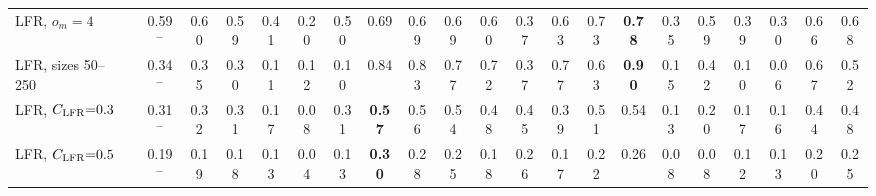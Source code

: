 \begin{table}[p]
{\begin{tabular}{llcccc|cc|cccccc|cccccccc}
LFR, $o_m{=}4$ &  & 0.59$^{-}$ & 0.60 & 0.59 & 0.41 & 0.20 & 0.50 & 0.69 & 0.69 & 0.69 & 0.60 & 0.37 & 0.63 & 0.73 & \textbf{0.78} & 0.35 & 0.59 & 0.39 & 0.30 & 0.66 & 0.68 \\
LFR, sizes 50--250 &  & 0.34$^{-}$ & 0.35 & 0.30 & 0.11 & 0.12 & 0.10 & 0.84 & 0.83 & 0.77 & 0.72 & 0.37 & 0.77 & 0.63 & \textbf{0.90} & 0.15 & 0.42 & 0.10 & 0.06 & 0.67 & 0.52 \\
LFR, $C_{\rm LFR}{=}0.3$ &  & 0.31$^{-}$ & 0.32 & 0.31 & 0.17 & 0.08 & 0.31 & \textbf{0.57} & 0.56 & 0.54 & 0.48 & 0.45 & 0.39 & 0.51 & 0.54 & 0.13 & 0.20 & 0.17 & 0.16 & 0.44 & 0.48 \\
LFR, $C_{\rm LFR}{=}0.5$ &  & 0.19$^{-}$ & 0.19 & 0.18 & 0.13 & 0.04 & 0.13 & \textbf{0.30} & 0.28 & 0.25 & 0.18 & 0.26 & 0.17 & 0.22 & 0.26 & 0.08 & 0.08 & 0.12 & 0.13 & 0.20 & 0.25 \\
\hline\hline
\end{tabular}}
\end{table}

